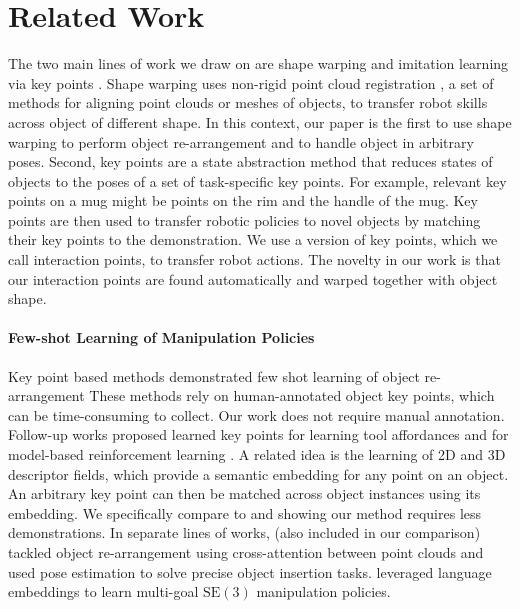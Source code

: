 \documentclass{article}
\begin{document}
\section{Related Work}

The two main lines of work we draw on are shape warping \cite{rodriguez18transferring,thompson21shapebased} and imitation learning via key points \cite{manuelli19kpam}. Shape warping uses non-rigid point cloud registration \cite{huang21comprehensive}, a set of methods for aligning point clouds or meshes of objects, to transfer robot skills across object of different shape. In this context, our paper is the first to use shape warping to perform object re-arrangement and to handle object in arbitrary poses. Second, key points are a state abstraction method that reduces states of objects to the poses of a set of task-specific key points. For example, relevant key points on a mug might be points on the rim and the handle of the mug. Key points are then used to transfer robotic policies to novel objects by matching their key points to the demonstration. We use a version of key points, which we call interaction points, to transfer robot actions. The novelty in our work is that our interaction points are found automatically and warped together with object shape.

\paragraph{Few-shot Learning of Manipulation Policies} Key point based methods demonstrated few shot learning of object re-arrangement \citet{manuelli19kpam,gao21kpam,gao21kpamsc} These methods rely on human-annotated object key points, which can be time-consuming to collect. Our work does not require manual annotation. Follow-up works proposed learned key points for learning tool affordances \cite{qin20keto,vecerik20s3k,turpin21gift} and for model-based reinforcement learning \cite{manuelli20keypoints}. A related idea is the learning of 2D \cite{florence18dense} and 3D \cite{simeonov22neural,simeonov22se,ryu22equivariant,chun23local} descriptor fields, which provide a semantic embedding for any point on an object. An arbitrary key point can then be matched across object instances using its embedding. We specifically compare to \citet{simeonov22neural,simeonov22se} and showing our method requires less demonstrations. In separate lines of works, \citet{pan22taxpose} (also included in our comparison) tackled object re-arrangement using cross-attention \cite{vaswani17attention} between point clouds and \citet{wen22you} used pose estimation to solve precise object insertion tasks. \citet{shridhar22perceiveractor} leveraged language embeddings to learn multi-goal $\mathrm{SE}(3)$ manipulation policies.
\end{document}
